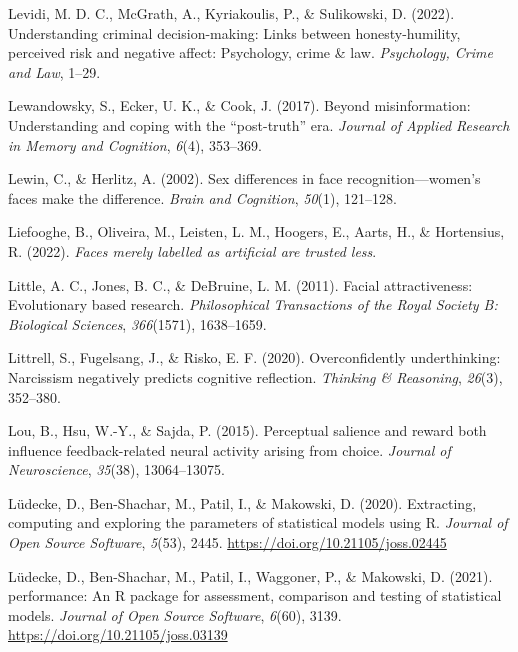\documentclass[
  man,floatsintext]{apa6}
\newlength{\cslhangindent}
\newlength{\cslentryspacingunit} %
\newenvironment{CSLReferences}[2] %
 {%
  \setlength{\parindent}{0pt}
  \ifodd #1
  \let\oldpar\par
  \def\par{\hangindent=\cslhangindent\oldpar}
  \fi
  \setlength{\parskip}{#2\cslentryspacingunit}
 }%
 {}
\begin{document}
\begin{CSLReferences}{1}{0}
\leavevmode{}%
Levidi, M. D. C., McGrath, A., Kyriakoulis, P., \& Sulikowski, D. (2022). Understanding criminal decision-making: Links between honesty-humility, perceived risk and negative affect: Psychology, crime \& law. \emph{Psychology, Crime and Law}, 1--29.

\leavevmode{}%
Lewandowsky, S., Ecker, U. K., \& Cook, J. (2017). Beyond misinformation: Understanding and coping with the {``post-truth''} era. \emph{Journal of Applied Research in Memory and Cognition}, \emph{6}(4), 353--369.

\leavevmode{}%
Lewin, C., \& Herlitz, A. (2002). Sex differences in face recognition---women's faces make the difference. \emph{Brain and Cognition}, \emph{50}(1), 121--128.

\leavevmode{}%
Liefooghe, B., Oliveira, M., Leisten, L. M., Hoogers, E., Aarts, H., \& Hortensius, R. (2022). \emph{Faces merely labelled as artificial are trusted less}.

\leavevmode{}%
Little, A. C., Jones, B. C., \& DeBruine, L. M. (2011). Facial attractiveness: Evolutionary based research. \emph{Philosophical Transactions of the Royal Society B: Biological Sciences}, \emph{366}(1571), 1638--1659.

\leavevmode{}%
Littrell, S., Fugelsang, J., \& Risko, E. F. (2020). Overconfidently underthinking: Narcissism negatively predicts cognitive reflection. \emph{Thinking \& Reasoning}, \emph{26}(3), 352--380.

\leavevmode{}%
Lou, B., Hsu, W.-Y., \& Sajda, P. (2015). Perceptual salience and reward both influence feedback-related neural activity arising from choice. \emph{Journal of Neuroscience}, \emph{35}(38), 13064--13075.

\leavevmode{}%
Lüdecke, D., Ben-Shachar, M., Patil, I., \& Makowski, D. (2020). Extracting, computing and exploring the parameters of statistical models using {R}. \emph{Journal of Open Source Software}, \emph{5}(53), 2445. \url{https://doi.org/10.21105/joss.02445}

\leavevmode{}%
Lüdecke, D., Ben-Shachar, M., Patil, I., Waggoner, P., \& Makowski, D. (2021). {performance}: An {R} package for assessment, comparison and testing of statistical models. \emph{Journal of Open Source Software}, \emph{6}(60), 3139. \url{https://doi.org/10.21105/joss.03139}


\end{CSLReferences}
\end{document}
